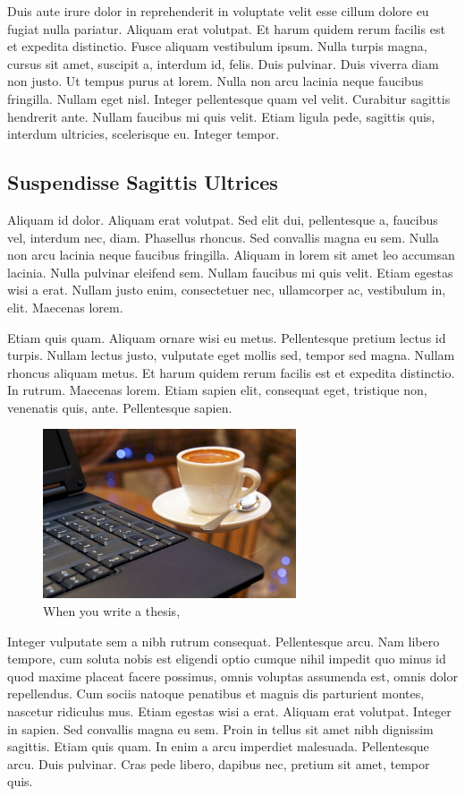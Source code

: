 \documentclass[english,master,dept460,male,cpp,cpdeclaration]{diploma}
\begin{document}
Duis aute irure dolor in reprehenderit in voluptate velit esse cillum dolore eu fugiat nulla pariatur. Aliquam erat volutpat. Et harum quidem rerum facilis est et expedita distinctio. Fusce aliquam vestibulum ipsum. Nulla turpis magna, cursus sit amet, suscipit a, interdum id, felis. Duis pulvinar. Duis viverra diam non justo. Ut tempus purus at lorem. Nulla non arcu lacinia neque faucibus fringilla. Nullam eget nisl. Integer pellentesque quam vel velit. Curabitur sagittis hendrerit ante. Nullam faucibus mi quis velit. Etiam ligula pede, sagittis quis, interdum ultricies, scelerisque eu. Integer tempor.

\subsection{Suspendisse Sagittis Ultrices}
Aliquam id dolor. Aliquam erat volutpat. Sed elit dui, pellentesque a, faucibus vel, interdum nec, diam. Phasellus rhoncus. Sed convallis magna eu sem. Nulla non arcu lacinia neque faucibus fringilla. Aliquam in lorem sit amet leo accumsan lacinia. Nulla pulvinar eleifend sem. Nullam faucibus mi quis velit. Etiam egestas wisi a erat. Nullam justo enim, consectetuer nec, ullamcorper ac, vestibulum in, elit. Maecenas lorem.

Etiam quis quam. Aliquam ornare wisi eu metus. Pellentesque pretium lectus id turpis. Nullam lectus justo, vulputate eget mollis sed, tempor sed magna. Nullam rhoncus aliquam metus. Et harum quidem rerum facilis est et expedita distinctio. In rutrum. Maecenas lorem. Etiam sapien elit, consequat eget, tristique non, venenatis quis, ante. Pellentesque sapien.

\begin{figure}
	\centering
	\includegraphics[width=75mm]{Figures/CoffeeAndComputer.jpg}
	\caption{When you write a thesis, \cite{AhDTEmY2CY7Qv65e}}
	\label{fig:WritingThesis}
\end{figure}

Integer vulputate sem a nibh rutrum consequat. Pellentesque arcu. Nam libero tempore, cum soluta nobis est eligendi optio cumque nihil impedit quo minus id quod maxime placeat facere possimus, omnis voluptas assumenda est, omnis dolor repellendus. Cum sociis natoque penatibus et magnis dis parturient montes, nascetur ridiculus mus. Etiam egestas wisi a erat. Aliquam erat volutpat. Integer in sapien. Sed convallis magna eu sem. Proin in tellus sit amet nibh dignissim sagittis. Etiam quis quam. In enim a arcu imperdiet malesuada. Pellentesque arcu. Duis pulvinar. Cras pede libero, dapibus nec, pretium sit amet, tempor quis.
\end{document}
